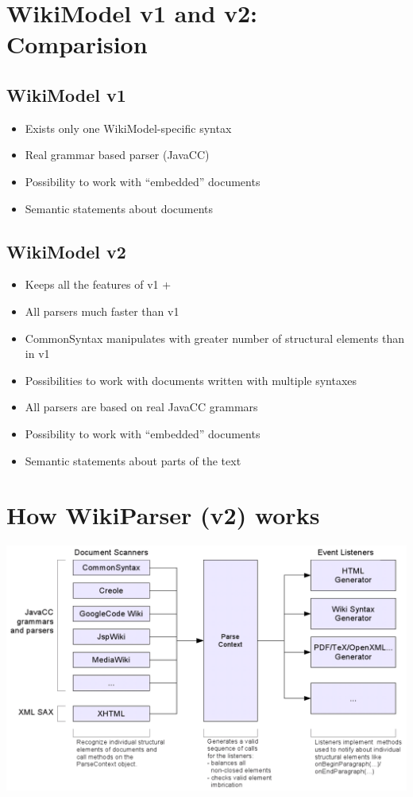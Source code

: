 \documentclass{article}
\begin{document}
\section{WikiModel v1 and v2: Comparision}

\subsection{WikiModel v1}
\begin{itemize}
 \item Exists only one WikiModel-specific  syntax 
 \item Real grammar based parser (JavaCC)
 \item Possibility to work with “embedded” documents
 \item Semantic statements about documents 
\end{itemize}

\subsection{WikiModel v2 }
\begin{itemize}
 \item Keeps all the features of v1 +
 \item All parsers much faster than v1
 \item CommonSyntax manipulates with greater number of structural elements than in v1
 \item Possibilities to work with documents written with multiple syntaxes
 \item All parsers are based on real JavaCC grammars
 \item Possibility to work with “embedded” documents
 \item Semantic statements about parts of the text  
\end{itemize}

\section{How WikiParser (v2) works}

\includegraphics[bb=0 0 300 183]{HowWikiParserV2Works.png}
\end{document}
